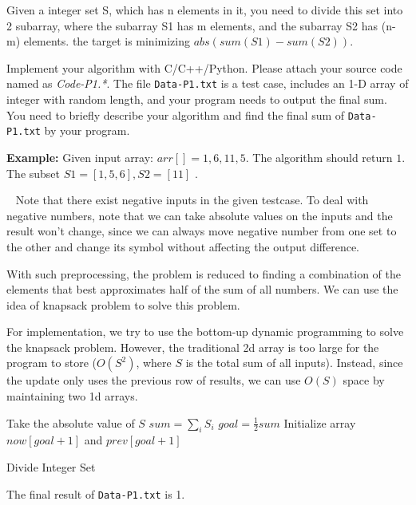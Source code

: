 \begin{exercise}[]{Given a integer set S, which has n elements in it, you need to divide this set into 2 subarray, where the subarray S1 has m elements, and the subarray S2 has (n-m) elements. the target is minimizing $abs(sum(S1) -sum(S2))$.
    
    Implement your algorithm with C/C++/Python. Please attach your source code named as {\color{red}\emph{Code-P1.*}}. The file \texttt{Data-P1.txt} is a test case, includes an 1-D array of integer with random length, and your program needs to output the final sum. You need to briefly describe your algorithm and find the final sum of \texttt{Data-P1.txt} by your program.
    
    \textbf{Example:} Given input array: $arr[]={1, 6, 11, 5}$. The algorithm should return $1$. The subset $S1=[1, 5, 6], S2=[11]$ .
    }
  \begin{solution}
  \par{~}
  Note that there exist negative inputs in the given testcase. To deal with negative numbers, note that we can take absolute values on the inputs and the result won't change, since we can always move negative number from one set to the other and change its symbol without affecting the output difference.

  With such preprocessing, the problem is reduced to finding a combination of the elements that best approximates half of the sum of all numbers. We can use the idea of knapsack problem to solve this problem.

  For implementation, we try to use the bottom-up dynamic programming to solve the knapsack problem. However, the traditional 2d array is too large for the program to store ($O(S^2)$, where $S$ is the total sum of all inputs). Instead, since the update only uses the previous row of results, we can use $O(S)$ space by maintaining two 1d arrays.

  \begin{algorithm}[H]
    \BlankLine
    Take the absolute value of $S$ \;
    $sum = \sum_i S_i$\;
    $goal = \frac{1}{2} sum$ \;
    Initialize array $now[goal+1]$ and $prev[goal+1]$\;
    \caption{Divide Integer Set \label{js1}}
  \end{algorithm}

  The final result of \texttt{Data-P1.txt} is 1.
  \end{solution}
  \label{ex1}
\end{exercise}



